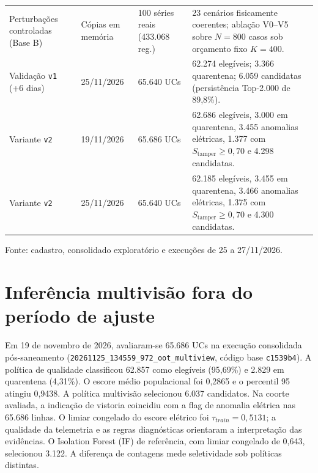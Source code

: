 \begin{longtable}{@{}p{.21\linewidth}p{.16\linewidth}p{.17\linewidth}p{}@{}}
Perturbações controladas (Base B) & Cópias em memória & 100 séries reais (433.068 reg.) & 23 cenários fisicamente coerentes; ablação V0--V5 sobre $N = 800$ casos sob orçamento fixo $K = 400$. \\
Validação \texttt{v1} (+6 dias) & 25/11/2026 & 65.640 UCs & 62.274 elegíveis; 3.366 quarentena; 6.059 candidatas (persistência Top-2.000 de 89,8\%). \\
Variante \texttt{v2} & 19/11/2026 & 65.686 UCs & 62.686 elegíveis, 3.000 em quarentena, 3.455 anomalias elétricas, 1.377 com $S_{\mathrm{tamper}}\ge0{,}70$ e 4.298 candidatas. \\
Variante \texttt{v2} & 25/11/2026 & 65.640 UCs & 62.185 elegíveis, 3.455 em quarentena, 3.466 anomalias elétricas, 1.375 com $S_{\mathrm{tamper}}\ge0{,}70$ e 4.300 candidatas. \\
\hline
\end{longtable}
\noindent Fonte: cadastro, consolidado exploratório e execuções de 25 a 27/11/2026.\par
\endgroup

\section{Inferência multivisão fora do período de ajuste}
Em 19 de novembro de 2026, avaliaram-se 65.686 UCs na execução consolidada pós-saneamento (\texttt{20261125\_134559\_972\_oot\_multiview}, código base \texttt{c1539b4}). A política de qualidade classificou 62.857 como elegíveis (95,69\%) e 2.829 em quarentena (4,31\%). O escore médio populacional foi 0,2865 e o percentil 95 atingiu 0,9438. A política multivisão selecionou 6.037 candidatos. Na coorte avaliada, a indicação de vistoria coincidiu com a flag de anomalia elétrica nas 65.686 linhas. O limiar congelado do escore elétrico foi $\tau_{train}=0{,}5131$; a qualidade da telemetria e as regras diagnósticas orientaram a interpretação das evidências. O Isolation Forest (IF) de referência, com limiar congelado de 0,643, selecionou 3.122. A diferença de contagens mede seletividade sob políticas distintas.

